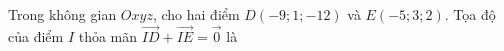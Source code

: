 \begin{ex}
Trong không gian $Oxyz$, cho hai điểm $D(-9;1;-12)$ và $E(-5;3;2)$. Tọa độ của điểm $I$ thỏa mãn $\overrightarrow{ID}+\overrightarrow{IE}=\vec 0$ là
\end{ex}
